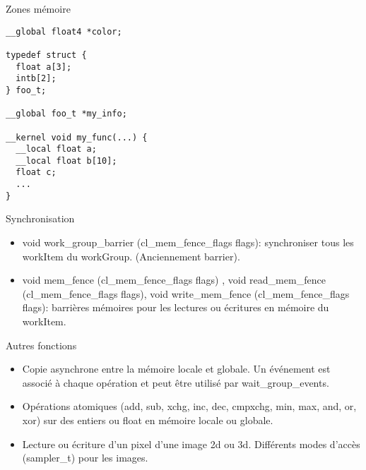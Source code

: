 \documentclass[10pt]{beamer}
\begin{document}
\begin{frame}[fragile]{Zones mémoire}

  \scriptsize
  \begin{verbatim}
__global float4 *color;

typedef struct {
  float a[3];
  intb[2];
} foo_t;

__global foo_t *my_info;

__kernel void my_func(...) {
  __local float a;
  __local float b[10];
  float c;
  ...
}
  \end{verbatim}
\end{frame}

\begin{frame}{Synchronisation}

  \begin{itemize}
    \item void work\_group\_barrier (cl\_mem\_fence\_flags flags): synchroniser tous les workItem du workGroup. (Anciennement barrier).

    \item void mem\_fence (cl\_mem\_fence\_flags flags) , void read\_mem\_fence (cl\_mem\_fence\_flags flags), void write\_mem\_fence (cl\_mem\_fence\_flags flags): barrières mémoires pour les lectures ou écritures en mémoire du workItem.
  \end{itemize}
\end{frame}

\begin{frame}{Autres fonctions}

  \begin{itemize}
    \item Copie asynchrone entre la mémoire locale et globale. Un événement est associé à chaque opération et peut être utilisé par wait\_group\_events.

    \item Opérations atomiques (add, sub, xchg, inc, dec, cmpxchg, min, max, and, or, xor) sur des entiers ou float en mémoire locale ou globale.

    \item Lecture ou écriture d'un pixel d'une image 2d ou 3d. Différents modes d'accès (sampler\_t) pour les images.
  \end{itemize}
\end{frame}
\end{document}
